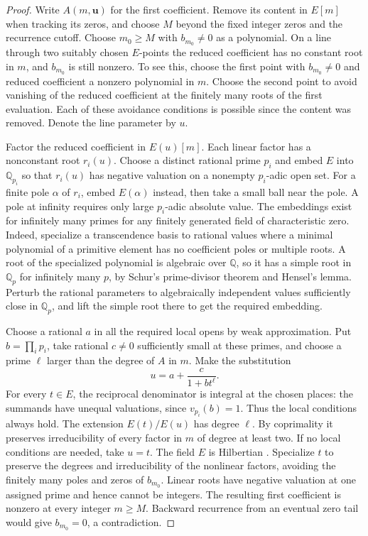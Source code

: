 \documentclass[11pt]{article}
\newcommand{\QQ}{\mathbb Q}
\begin{document}
\begin{proof}
Write \(A(m,\boldsymbol u)\) for the first coefficient. Remove its
content in \(E[m]\) when tracking its zeros, and choose \(M\) beyond
the fixed integer zeros and the recurrence cutoff. Choose
\(m_0\ge M\) with \(b_{m_0}\ne0\) as a polynomial. On a line through
two suitably chosen \(E\)-points the reduced coefficient has no
constant root in \(m\), and \(b_{m_0}\) is still nonzero. To see this,
choose the first point with \(b_{m_0}\ne0\) and reduced coefficient
a nonzero polynomial in \(m\). Choose the second point to avoid
vanishing of the reduced coefficient at the finitely many roots
of the first evaluation. Each of these avoidance conditions is
possible since the content was removed. Denote the line parameter
by \(u\).

Factor the reduced coefficient in \(E(u)[m]\). Each linear factor
has a nonconstant root \(r_i(u)\). Choose a distinct rational
prime \(p_i\) and embed \(E\) into \(\QQ_{p_i}\) so that \(r_i(u)\)
has negative valuation on a nonempty \(p_i\)-adic open set. For
a finite pole \(\alpha\) of \(r_i\), embed \(E(\alpha)\) instead,
then take a small ball near the pole. A pole at infinity requires
only large \(p_i\)-adic absolute value. The embeddings exist for
infinitely many primes for any finitely generated field of
characteristic zero. Indeed, specialize a transcendence basis to
rational values where a minimal polynomial of a primitive element
has no coefficient poles or multiple roots. A root of the specialized
polynomial is algebraic over \(\QQ\), so it has a simple root in
\(\QQ_p\) for infinitely many \(p\), by Schur's prime-divisor theorem
and Hensel's lemma. Perturb the rational parameters to algebraically
independent values sufficiently close in \(\QQ_p\), and lift the
simple root there to get the required embedding.

Choose a rational \(a\) in all the required local opens by weak
approximation. Put \(b=\prod_i p_i\), take rational \(c\ne0\)
sufficiently small at these primes, and choose a prime \(\ell\)
larger than the degree of \(A\) in \(m\). Make the substitution
\[
                         u=a+\frac{c}{1+b t^\ell}.
\]
For every \(t\in E\), the reciprocal denominator is integral at the
chosen places: the summands have unequal valuations, since
\(v_{p_i}(b)=1\). Thus the local conditions always hold. The extension
\(E(t)/E(u)\) has degree \(\ell\). By coprimality it preserves
irreducibility of every factor in \(m\) of degree at least two.
If no local conditions are needed, take \(u=t\). The field \(E\) is
Hilbertian \cite[Chapter~13]{FriedJarden}. Specialize \(t\) to
preserve the degrees and irreducibility of the nonlinear factors,
avoiding the finitely many poles and zeros of \(b_{m_0}\). Linear
roots have negative valuation at one assigned prime and hence
cannot be integers. The resulting first coefficient is nonzero
at every integer \(m\ge M\). Backward recurrence from an eventual
zero tail would give \(b_{m_0}=0\), a contradiction.
\end{proof}
\end{document}
